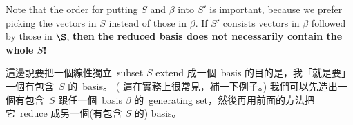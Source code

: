 \begin{remark} \label{remark 3.4.6}
Note that the order for putting \(S\) and \(\beta\) into \(S'\) is important,
because we prefer picking the vectors in \(S\) instead of those in \(\beta\).
If \(S'\) consists vectors in \(\beta\) followed by those in \(\S\), \textbf{then the reduced basis does not necessarily contain the whole \(S\)!}
\end{remark}

\begin{note}
這邊說要把一個線性獨立\ subset \(S\) extend 成一個\ basis 的目的是，我「就是要」一個有包含\ \(S\) 的\ basis。
(\TODOREF{} 這在實務上很常見，補一下例子。)
我們可以先造出一個有包含\ \(S\) 跟任一個\ basis \(\beta\) 的\ generating set，然後再用前面的方法把它\ reduce 成另一個(有包含 \(S\) 的) basis。
\end{note}

